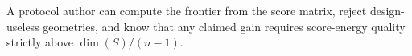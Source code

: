 A protocol author can compute the frontier from the score matrix, reject design-useless geometries, and know that any claimed gain requires score-energy quality strictly above \(\dim(S)/(n-1)\).
